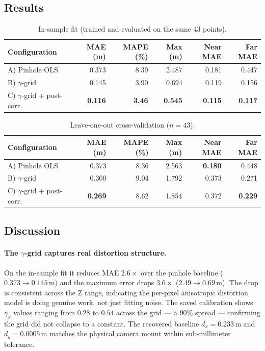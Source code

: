 \documentclass[11pt]{article}
\begin{document}
\subsection{Results}

\begin{table}[h]
\centering
\caption{In-sample fit (trained and evaluated on the same $43$ points).}
\label{tab:in_sample}
\begin{tabular}{lrrrrr}
\toprule
Configuration & MAE (m) & MAPE (\%) & Max (m) & Near MAE & Far MAE \\
\midrule
A) Pinhole OLS                & 0.373 & 8.39 & 2.487 & 0.181 & 0.447 \\
B) $\gamma$-grid              & 0.145 & 3.90 & 0.694 & 0.119 & 0.156 \\
C) $\gamma$-grid + post-corr. & \textbf{0.116} & \textbf{3.46} & \textbf{0.545} & \textbf{0.115} & \textbf{0.117} \\
\bottomrule
\end{tabular}
\end{table}

\begin{table}[h]
\centering
\caption{Leave-one-out cross-validation ($n = 43$).}
\label{tab:loo}
\begin{tabular}{lrrrrr}
\toprule
Configuration & MAE (m) & MAPE (\%) & Max (m) & Near MAE & Far MAE \\
\midrule
A) Pinhole OLS                & 0.373 & 8.36 & 2.563 & \textbf{0.180} & 0.448 \\
B) $\gamma$-grid              & 0.300 & 9.04 & 1.792 & 0.373 & 0.271 \\
C) $\gamma$-grid + post-corr. & \textbf{0.269} & 8.62 & 1.854 & 0.372 & \textbf{0.229} \\
\bottomrule
\end{tabular}
\end{table}

\subsection{Discussion}

\paragraph{The $\gamma$-grid captures real distortion structure.} On the in-sample fit it
reduces MAE $2.6\times$ over the pinhole baseline ($0.373 \to 0.145$\,m) and the maximum
error drops $3.6\times$ ($2.49 \to 0.69$\,m). The drop is consistent across the Z range,
indicating the per-pixel anisotropic distortion model is doing genuine work, not just
fitting noise. The saved calibration shows $\gamma_x$ values ranging from $0.28$ to
$0.54$ across the grid --- a $90\%$ spread --- confirming the grid did not collapse to a
constant. The recovered baseline $d_x = 0.233$\,m and $d_y = 0.0005$\,m matches the
physical camera mount within sub-millimeter tolerance.
\end{document}
